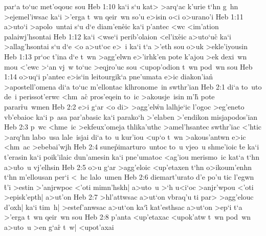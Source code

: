 par`a
to`uc
met'oqouc
sou\bibvsend
\vs Heb 1:10
ka`i
s`u
kat>
>arq`ac
k'urie
t`hn
g~hn
>ejemel'iwsac
ka`i
>'erga
t~wn
qeir~wn
so'u
e>isin
o<i
o>urano'i\bibvsend
\vs Heb 1:11
a>uto`i
>apolo~untai
s`u
d`e
diam'en\r{e}ic
ka`i
p'antec
<wc
<im'ation
palaiwj'hsontai\bibvsend
\vs Heb 1:12
ka`i
<wse`i
perib'olaion
<el'ix\r{e}ic
a>uto`u\r{c}
ka`i
>allag'hsontai
s`u
d`e
<o
a>ut`oc
e>~i
ka`i
t`a
>'eth
sou
o>uk
>ekle'iyousin\bibvsend
\vs Heb 1:13
pr`oc
t'ina
d`e
t~wn
>agg'elwn
e>'irhk'en
pote
k'ajou
>ek
dexi~wn
mou
<'ewc
>`an
vj~w
to`uc
>eqjro'uc
sou
<upop'odion
t~wn
pod~wn
sou\bibvsend
\vs Heb 1:14
o>uq`i
p'antec
e>is`in
leitourgik`a
pne'umata
e>ic
diakon'ia\r{n}
>apostell'omena
di`a
to`uc
m'ellontac
klhronome~in
swthr'ian\bibvsend
\vs Heb 2:1
di`a
to~uto
de~i
perissot'erwc
<hm~ac\r{}
pros'eqein
to~ic
>akousje~isin
m'h\r{}
pote
parar\r{r}u~wmen\bibvsend
{}
\vs Heb 2:2
e>i
g`ar
<o
di>
>agg'el\r{w}n
lalhje`ic
l'ogoc
>eg'eneto
vb'ebaioc
ka`i
p~asa
par'abasic
ka`i
parako`h
>'elaben
>'endikon
misjapodos'ian\bibvsend
\vs Heb 2:3
p~wc
<hme~ic
>ekfeux'omeja
thlika'uthc
>amel'hsantec
swthr'iac
<'htic
>arq`hn
labo~usa
lale~isjai
di`a
to~u
kur'iou
<up`o
t~wn
>akous'antwn
e>ic
<hm~ac
>ebebai'wjh\bibvsend
\vs Heb 2:4
sun\-e\r{p}i\-mar\-tu\-ro~un\-toc
to~u
vjeo~u
shme'ioic
\r{t}e
ka`i
t'erasin
ka`i
poik'ilaic
dun'amesin
ka`i
pne'umatoc
<ag'iou
merismo~ic
kat`a
t`hn
a>u\r{t}o~u
vj'elhsin\bibvsend
\vs Heb 2:5
o>u
g`ar
>agg'eloic
<up'etaxen
t`hn
o>ikoum'enhn
t`hn
m'ellousan
per`i
<~hc
lalo~umen\bibvsend
\vs Heb 2:6
diemart'urato
d'e
po'u
tic
l'egwn
\r{t}'i
>estin
>'anjrwpoc
<'oti
mimn'hskh|
a>uto~u
>`h
u<i`oc
>anjr'wpou
<'oti
>episk'epth|
a>ut'on\bibvsend
\vs Heb 2:7
>hl'attwsac
a>ut`on
vbraq'u
ti
par>
>agg'elouc
d'oxh|
ka`i
tim~h|
>estef'anwsac
a>ut`on
ka`i\r{}
kat'esthsac
a>ut`on
>ep`i
t`a
>'erga
t~wn
qeir~wn
sou\bibvsend
\vs Heb 2:8
p'anta
<up'etaxac
<upok'atw
t~wn
pod~wn
a>uto~u
>en
g`ar\r{}
t~w|
<upot'axai
